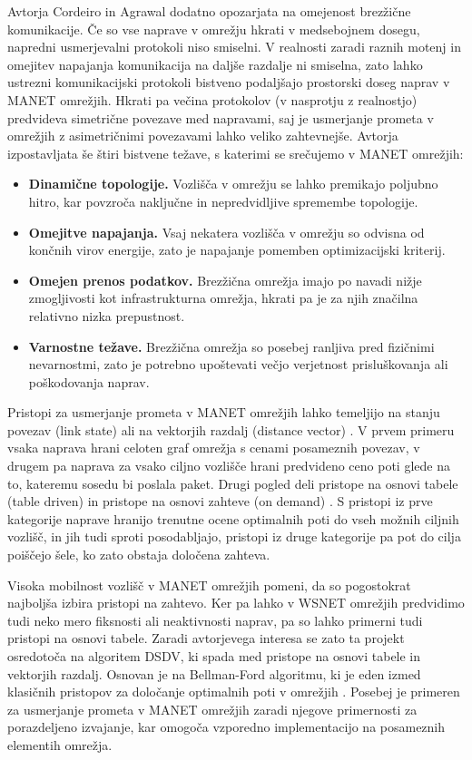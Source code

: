 Avtorja Cordeiro in Agrawal \cite{cordeiro2011ad} dodatno opozarjata na omejenost brezžične komunikacije. Če so vse naprave v omrežju hkrati v medsebojnem dosegu, napredni usmerjevalni protokoli niso smiselni. V realnosti zaradi raznih motenj in omejitev napajanja komunikacija na daljše razdalje ni smiselna, zato lahko ustrezni komunikacijski protokoli bistveno podaljšajo prostorski doseg naprav v MANET omrežjih. Hkrati pa večina protokolov (v nasprotju z realnostjo) predvideva simetrične povezave med napravami, saj je usmerjanje prometa v omrežjih z asimetričnimi povezavami lahko veliko zahtevnejše. Avtorja izpostavljata še štiri bistvene težave, s katerimi se srečujemo v MANET omrežjih:
\begin{itemize}
  \item \textbf{Dinamične topologije.} Vozlišča v omrežju se lahko premikajo poljubno hitro, kar povzroča naključne in nepredvidljive spremembe topologije.
  \item \textbf{Omejitve napajanja.} Vsaj nekatera vozlišča v omrežju so odvisna od končnih virov energije, zato je napajanje pomemben optimizacijski kriterij.
  \item \textbf{Omejen prenos podatkov.} Brezžična omrežja imajo po navadi nižje zmogljivosti kot infrastrukturna omrežja, hkrati pa je za njih značilna relativno nizka prepustnost.
  \item \textbf{Varnostne težave.} Brezžična omrežja so posebej ranljiva pred fizičnimi nevarnostmi, zato je potrebno upoštevati večjo verjetnost prisluškovanja ali poškodovanja naprav.
\end{itemize}

Pristopi za usmerjanje prometa v MANET omrežjih lahko temeljijo na stanju povezav (link state) ali na vektorjih razdalj (distance vector) \cite{perkins1994highly}. V prvem primeru vsaka naprava hrani celoten graf omrežja s cenami posameznih povezav, v drugem pa naprava za vsako ciljno vozlišče hrani predvideno ceno poti glede na to, kateremu sosedu bi poslala paket. Drugi pogled deli pristope na osnovi tabele (table driven) in pristope na osnovi zahteve (on demand) \cite{misra1999routing}. S pristopi iz prve kategorije naprave hranijo trenutne ocene optimalnih poti do vseh možnih ciljnih vozlišč, in jih tudi sproti posodabljajo, pristopi iz druge kategorije pa pot do cilja poiščejo šele, ko zato obstaja določena zahteva.

Visoka mobilnost vozlišč v MANET omrežjih pomeni, da so pogostokrat najboljša izbira pristopi na zahtevo. Ker pa lahko v WSNET omrežjih predvidimo tudi neko mero fiksnosti ali neaktivnosti naprav, pa so lahko primerni tudi pristopi na osnovi tabele. Zaradi avtorjevega interesa se zato ta projekt osredotoča na algoritem DSDV, ki spada med pristope na osnovi tabele in vektorjih razdalj. Osnovan je na Bellman-Ford algoritmu, ki je eden izmed klasičnih pristopov za določanje optimalnih poti v omrežjih \cite{bertsekas1992data}. Posebej je primeren za usmerjanje prometa v MANET omrežjih zaradi njegove primernosti za porazdeljeno izvajanje, kar omogoča vzporedno implementacijo na posameznih elementih omrežja.

